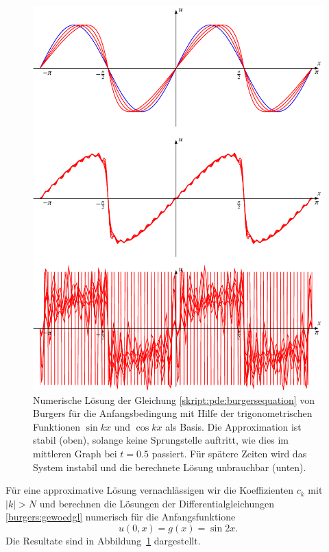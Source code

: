 \begin{figure}
\centering
\includegraphics{chapters/2/burgfourier.pdf}
\caption{Numerische Lösung der Gleichung
\eqref{skript:pde:burgersequation}
von Burgers für die Anfangsbedingung mit Hilfe der trigonometrischen
Funktionen $\sin kx$ und $\cos kx$ als Basis.
Die Approximation ist stabil (oben), solange keine Sprungstelle auftritt,
wie dies im mittleren Graph bei $t=0.5$ passiert.
Für spätere Zeiten wird das System instabil und die berechnete Lösung
unbrauchbar (unten).
\label{skript:burgfourier}}
\end{figure}%

Für eine approximative Lösung vernachlässigen wir die Koeffizienten $c_k$
mit $|k|>N$ und berechnen die Lösungen der Differentialgleichungen
\eqref{burgers:gewoedgl} numerisch für die Anfangsfunktione
\begin{equation}
u(0,x) = g(x) = \sin 2x.
\end{equation}
Die Resultate sind in Abbildung~\ref{skript:burgfourier} dargestellt.

